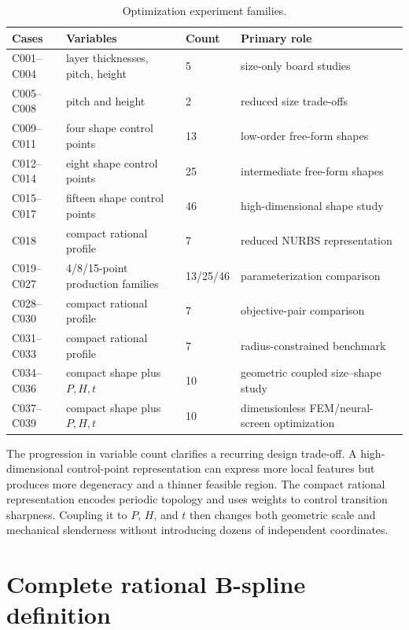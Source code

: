 \documentclass[11pt]{article}
\begin{document}
\begin{table}[H]
\centering\small
\caption{Optimization experiment families.}
\label{tab:case_taxonomy}
\begin{tabularx}{\textwidth}{lllX}
\toprule
Cases & Variables & Count & Primary role \\
\midrule
C001--C004 & layer thicknesses, pitch, height & 5 & size-only board studies \\
C005--C008 & pitch and height & 2 & reduced size trade-offs \\
C009--C011 & four shape control points & 13 & low-order free-form shapes \\
C012--C014 & eight shape control points & 25 & intermediate free-form shapes \\
C015--C017 & fifteen shape control points & 46 & high-dimensional shape study \\
C018 & compact rational profile & 7 & reduced NURBS representation \\
C019--C027 & 4/8/15-point production families & 13/25/46 & parameterization comparison \\
C028--C030 & compact rational profile & 7 & objective-pair comparison \\
C031--C033 & compact rational profile & 7 & radius-constrained benchmark \\
C034--C036 & compact shape plus $P,H,t$ & 10 & geometric coupled size--shape study \\
C037--C039 & compact shape plus $P,H,t$ & 10 & dimensionless FEM/neural-screen optimization \\
\bottomrule
\end{tabularx}
\end{table}

The progression in variable count clarifies a recurring design trade-off. A high-dimensional control-point representation can express more local features but produces more degeneracy and a thinner feasible region. The compact rational representation encodes periodic topology and uses weights to control transition sharpness. Coupling it to $P$, $H$, and $t$ then changes both geometric scale and mechanical slenderness without introducing dozens of independent coordinates.

\section{Complete rational B-spline definition}
\end{document}
